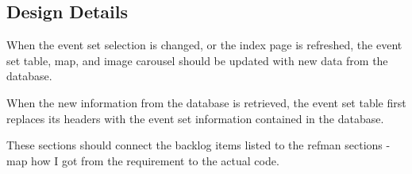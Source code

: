 \subsection{Design Details}
When the event set selection is changed, or the index page is refreshed, the event set table, map, and image carousel should be updated with new data from the database.

When the new information from the database is retrieved, the event set table first replaces its headers with the event set information contained in the database.

These sections should connect the backlog items listed to the refman sections - map how I got from the requirement to the actual code.

